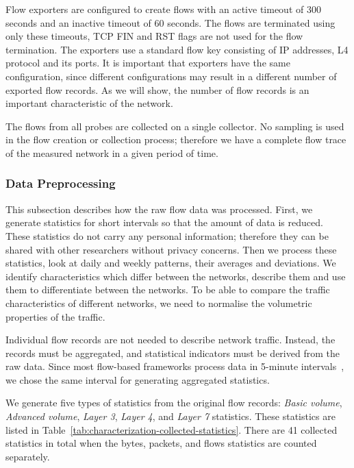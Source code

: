 Flow exporters are configured to create flows with an active timeout of 300 seconds and an inactive timeout of 60 seconds. The flows are terminated using only these timeouts, TCP FIN and RST flags are not used for the flow termination. The exporters use a standard flow key consisting of IP addresses, L4 protocol and its ports. It is important that exporters have the same configuration, since different configurations may result in a different number of exported flow records. As we will show, the number of flow records is an important characteristic of the network.

The flows from all probes are collected on a single collector. No sampling is used in the flow creation or collection process; therefore we have a complete flow trace of the measured network in a given period of time.


\subsubsection{Data Preprocessing}

This subsection describes how the raw flow data was processed. First, we generate statistics for short intervals so that the amount of data is reduced. These statistics do not carry any personal information; therefore they can be shared with other researchers without privacy concerns. Then we process these statistics, look at daily and weekly patterns, their averages and deviations. We identify characteristics which differ between the networks, describe them and use them to differentiate between the networks. To be able to compare the traffic characteristics of different networks, we need to normalise the volumetric properties of the traffic.

Individual flow records are not needed to describe network traffic. Instead, the records must be aggregated, and statistical indicators must be derived from the raw data. Since most flow-based frameworks process data in 5-minute intervals~\cite{Haag-2011-NfSen}, we chose the same interval for generating aggregated statistics.

We generate five types of statistics from the original flow records: \emph{Basic volume}, \emph{Advanced volume}, \emph{Layer 3}, \emph{Layer 4}, and \emph{Layer 7} statistics. These statistics are listed in Table~\ref{tab:characterization-collected-statistics}. There are 41 collected statistics in total when the bytes, packets, and flows statistics are counted separately. 

